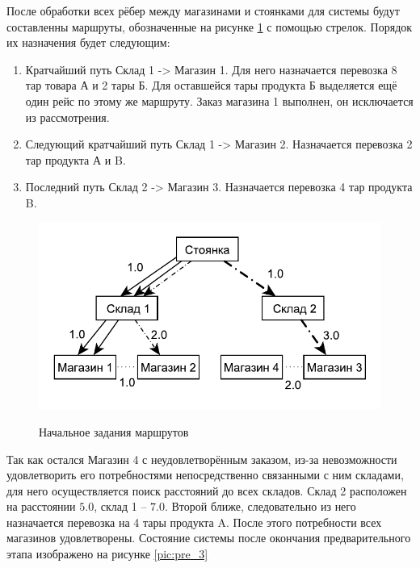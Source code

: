 	После обработки всех рёбер между магазинами и стоянками для системы будут составленны маршруты, обозначенные на рисунке \ref{pic:pre_2} с помощью стрелок. Порядок их назначения будет следующим:
	
	\begin{enumerate}
		\item Кратчайший путь Склад 1 -> Магазин 1. Для него назначается перевозка 8 тар товара А и 2 тары Б. Для оставшейся тары продукта Б выделяется ещё один рейс по этому же маршруту. Заказ магазина 1 выполнен, он исключается из рассмотрения.
		\item Следующий кратчайший путь Склад 1 -> Магазин 2. Назначается перевозка 2 тар продукта А и B.
		\item Последний путь Склад 2 -> Магазин 3. Назначается перевозка 4 тар продукта B.
	
	\end{enumerate}
	
	\begin{figure}[h]
		\begin{center}
			{\includegraphics[scale=1.0, angle=0]{img/max_elem_2.pdf}}
			\caption{Начальное задания маршрутов}
			\label{pic:pre_2}
		\end{center}
	\end{figure}

	Так как остался Магазин 4 с неудовлетворённым заказом, из-за невозможности удовлетворить его потребностями непосредственно связанными с ним складами, для него осуществляется поиск расстояний до всех складов. Склад 2 расположен на расстоянии $5.0$, склад 1 -- $7.0$. Второй ближе, следовательно из него назначается перевозка на 4 тары продукта A. После этого потребности всех магазинов удовлетворены. Состояние системы после окончания предварительного этапа изображено на рисунке \ref{pic:pre_3}
	

